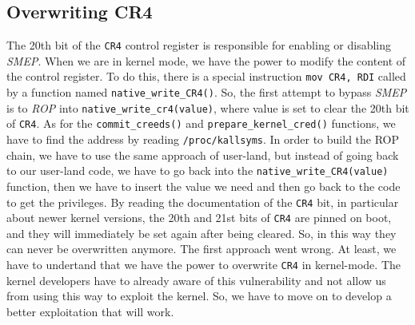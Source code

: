 \documentclass{masterthesis}
\begin{document}
\subsection{Overwriting CR4}
\label{subsect:CR4}
The 20th bit of the \texttt{CR4} control register is responsible for enabling or disabling \emph{SMEP}.
When we are in kernel mode, we have the power to modify the content of the control register.
To do this, there is a special instruction \lstinline{mov CR4, RDI} called by a function named \texttt{native\_write\_CR4()}.
So, the first attempt to bypass \emph{SMEP} is to \emph{ROP} into \texttt{native\_write\_cr4(value)}, where value is set to clear the 20th bit of \texttt{CR4}.
As for the \texttt{commit\_creeds()} and \texttt{prepare\_kernel\_cred()} functions, we have to find the address by reading \lstinline{/proc/kallsyms}.
In order to build the ROP chain, we have to use the same approach of user-land, but instead of going back to our user-land code, we have to go back into the \texttt{native\_write\_CR4(value)} function, then we have to insert the value we need and then go back to the code to get the privileges.
By reading the documentation of the \texttt{CR4} bit, in particular about newer kernel versions, the 20th and 21st bits of \texttt{CR4} are pinned on boot, and they will immediately be set again after being cleared. So, in this way they can never be overwritten anymore.
The first approach went wrong. At least, we have to undertand that we have the power to overwrite \texttt{CR4} in kernel-mode. The kernel developers have to already aware of this vulnerability and not allow us from using this way to exploit the kernel. So, we have to move on to develop a better exploitation that will work.
\end{document}
